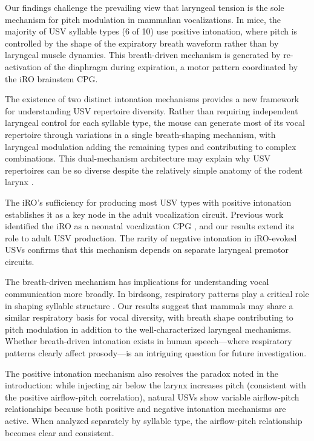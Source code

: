 \documentclass[11pt]{article}
\begin{document}
Our findings challenge the prevailing view that laryngeal tension is the sole mechanism for pitch modulation in mammalian vocalizations. In mice, the majority of USV syllable types (6 of 10) use positive intonation, where pitch is controlled by the shape of the expiratory breath waveform rather than by laryngeal muscle dynamics. This breath-driven mechanism is generated by re-activation of the diaphragm during expiration, a motor pattern coordinated by the iRO brainstem CPG.

The existence of two distinct intonation mechanisms provides a new framework for understanding USV repertoire diversity. Rather than requiring independent laryngeal control for each syllable type, the mouse can generate most of its vocal repertoire through variations in a single breath-shaping mechanism, with laryngeal modulation adding the remaining types and contributing to complex combinations. This dual-mechanism architecture may explain why USV repertoires can be so diverse despite the relatively simple anatomy of the rodent larynx \citep{riede2011}.

The iRO's sufficiency for producing most USV types with positive intonation establishes it as a key node in the adult vocalization circuit. Previous work identified the iRO as a neonatal vocalization CPG \citep{wei2022}, and our results extend its role to adult USV production. The rarity of negative intonation in iRO-evoked USVs confirms that this mechanism depends on separate laryngeal premotor circuits.

The breath-driven mechanism has implications for understanding vocal communication more broadly. In birdsong, respiratory patterns play a critical role in shaping syllable structure \citep{goller2004,suthers2004}. Our results suggest that mammals may share a similar respiratory basis for vocal diversity, with breath shape contributing to pitch modulation in addition to the well-characterized laryngeal mechanisms. Whether breath-driven intonation exists in human speech---where respiratory patterns clearly affect prosody---is an intriguing question for future investigation.

The positive intonation mechanism also resolves the paradox noted in the introduction: while injecting air below the larynx increases pitch (consistent with the positive airflow-pitch correlation), natural USVs show variable airflow-pitch relationships because both positive and negative intonation mechanisms are active. When analyzed separately by syllable type, the airflow-pitch relationship becomes clear and consistent.
\end{document}
